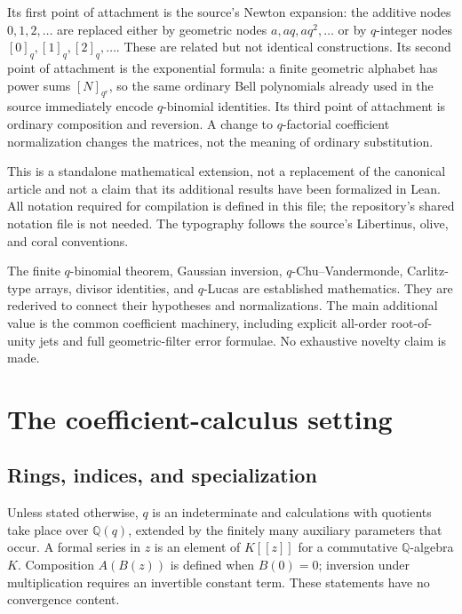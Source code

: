 \documentclass[11pt,a4paper,oneside,openany]{book}
\theoremstyle{definition}
\theoremstyle{remark}
\newcommand{\Q}{\mathbb Q}
\begin{document}
Its first point of attachment is the source's Newton expansion: the additive
nodes \(0,1,2,\ldots\) are replaced either by geometric nodes \(a,aq,aq^2,\ldots\)
or by \(q\)-integer nodes \([0]_q,[1]_q,[2]_q,\ldots\). These are related but not
identical constructions. Its second point of attachment is the exponential
formula: a finite geometric alphabet has power sums \([N]_{q^r}\), so the same
ordinary Bell polynomials already used in the source immediately encode
\(q\)-binomial identities. Its third point of attachment is ordinary composition
and reversion. A change to \(q\)-factorial coefficient normalization changes the
matrices, not the meaning of ordinary substitution.

This is a standalone mathematical extension, not a replacement of the canonical
article and not a claim that its additional results have been formalized in Lean.
All notation required for compilation is defined in this file; the repository's
shared notation file is not needed. The typography follows the source's
Libertinus, olive, and coral conventions.

\begin{auditbox}[title={What ``an extension'' means here}]
The finite \(q\)-binomial theorem, Gaussian inversion, \(q\)-Chu--Vandermonde,
Carlitz-type arrays, divisor identities, and \(q\)-Lucas are established
mathematics. They are rederived to connect their hypotheses and normalizations.
The main additional value is the common coefficient machinery, including
explicit all-order root-of-unity jets and full geometric-filter error formulae.
No exhaustive novelty claim is made.
\end{auditbox}
\begingroup
\small
\tableofcontents
\endgroup

\mainmatter
\chapter{The coefficient-calculus setting}
\label{qcc:setting}
\section{Rings, indices, and specialization}
Unless stated otherwise, \(q\) is an indeterminate and calculations with
quotients take place over \(\Q(q)\), extended by the finitely many auxiliary
parameters that occur. A formal series in \(z\) is an element of \(K[[z]]\) for a
commutative \(\Q\)-algebra \(K\). Composition \(A(B(z))\) is defined when
\(B(0)=0\); inversion under multiplication requires an invertible constant term.
These statements have no convergence content.
\end{document}
